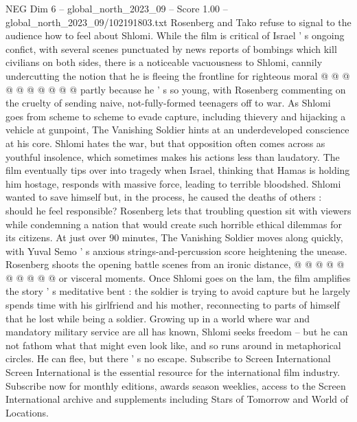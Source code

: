 \begin{textsample}{NEG Dim 6 – global\_north\_2023\_09 – Score 1.00 – global\_north\_2023\_09/102191803.txt}
Rosenberg and Tako refuse to signal to the audience how to feel about Shlomi.
While the film is critical of Israel ' s ongoing confict, with several scenes punctuated by news reports of bombings which kill civilians on both sides, there is a noticeable vacuousness to Shlomi, cannily undercutting the notion that he is fleeing the frontline for righteous moral @ @ @ @ @ @ @ @ @ @ partly because he ' s so young, with Rosenberg commenting on the cruelty of sending naive, not-fully-formed teenagers off to war.
As Shlomi goes from scheme to scheme to evade capture, including thievery and hijacking a vehicle at gunpoint, The Vanishing Soldier hints at an underdeveloped conscience at his core.
Shlomi hates the war, but that opposition often comes across as youthful insolence, which sometimes makes his actions less than laudatory.
The film eventually tips over into tragedy when Israel, thinking that Hamas is holding him hostage, responds with massive force, leading to terrible bloodshed.
Shlomi wanted to save himself but, in the process, he caused the deaths of others : should he feel responsible?
Rosenberg lets that troubling question sit with viewers while condemning a nation that would create such horrible ethical dilemmas for its citizens.
At just over 90 minutes, The Vanishing Soldier moves along quickly, with Yuval Semo ' s anxious strings-and-percussion score heightening the unease.
Rosenberg shoots the opening battle scenes from an ironic distance, @ @ @ @ @ @ @ @ @ @ or visceral moments.
Once Shlomi goes on the lam, the film amplifies the story ' s meditative bent : the soldier is trying to avoid capture but he largely spends time with his girlfriend and his mother, reconnecting to parts of himself that he lost while being a soldier.
Growing up in a world where war and mandatory military service are all has known, Shlomi seeks freedom -- but he can not fathom what that might even look like, and so runs around in metaphorical circles.
He can flee, but there ' s no escape.
Subscribe to Screen International Screen International is the essential resource for the international film industry.
Subscribe now for monthly editions, awards season weeklies, access to the Screen International archive and supplements including Stars of Tomorrow and World of Locations.

\end{textsample}
